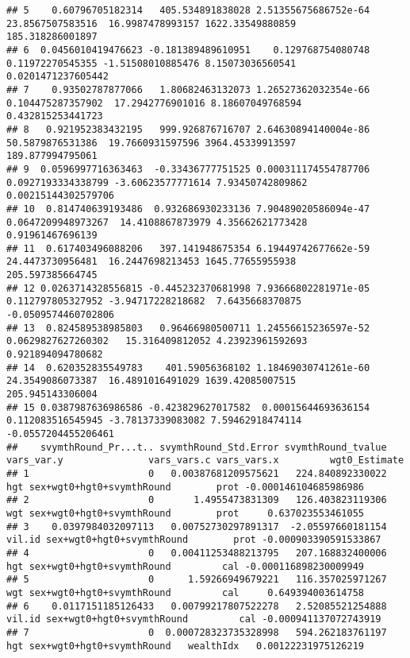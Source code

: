 \documentclass[
]{book}
\begin{document}
\begin{verbatim}
## 5    0.60796705182314   405.534891838028 2.51355675686752e-64   23.8567507583516  16.9987478993157 1622.33549880859     185.318286001897
## 6  0.0456010419476623 -0.181389489610951    0.129768754080748   0.11972270545355 -1.51508010885476 8.15073036560541   0.0201471237605442
## 7    0.93502787877066   1.80682463132073 1.26527362032354e-66  0.104475287357902  17.2942776901016 8.18607049768594    0.432815253441723
## 8   0.921952383432195   999.926876716707 2.64630894140004e-86   50.5879876531386  19.7660931597596 3964.45339913597     189.877994795061
## 9  0.0596997716363463  -0.33436777751525 0.000311174554787706 0.0927193334338799 -3.60623577771614 7.93450742809862  0.00215144302579706
## 10  0.814740639193486  0.932686930233136 7.90489020586094e-47 0.0647209948973267  14.4108867873979 4.35662621773428     0.91961467696139
## 11  0.617403496088206   397.141948675354 6.19449742677662e-59   24.4473730956481  16.2447698213453 1645.77655955938     205.597385664745
## 12 0.0263714328556815 -0.445232370681998 7.93666802281971e-05  0.112797805327952 -3.94717228218682  7.6435668370875  -0.0509574460702806
## 13  0.824589538985803   0.96466980500711 1.24556615236597e-52 0.0629827627260302   15.316409812052 4.23923961592693    0.921894094780682
## 14  0.620352835549783    401.59056368102 1.18469030741261e-60   24.3549086073387  16.4891016491029 1639.42085007515     205.945143306004
## 15 0.0387987636986586 -0.423829627017582  0.00015644693636154  0.112083516545945 -3.78137339083082 7.59462918474114  -0.0557204455206461
##    svymthRound_Pr...t.. svymthRound_Std.Error svymthRound_tvalue vars_var.y               vars_vars.c vars_vars.x         wgt0_Estimate
## 1                     0   0.00387681209575621   224.840892330022        hgt sex+wgt0+hgt0+svymthRound        prot -0.000146104685986986
## 2                     0       1.4955473831309   126.403823119306        wgt sex+wgt0+hgt0+svymthRound        prot     0.637023553461055
## 3    0.0397984032097113   0.00752730297891317  -2.05597660181154     vil.id sex+wgt0+hgt0+svymthRound        prot -0.000903390591533867
## 4                     0   0.00411253488213795   207.168832400006        hgt sex+wgt0+hgt0+svymthRound         cal -0.000116898230009949
## 5                     0      1.59266949679221   116.357025971267        wgt sex+wgt0+hgt0+svymthRound         cal     0.649394003614758
## 6    0.0117151185126433   0.00799217807522278   2.52085521254888     vil.id sex+wgt0+hgt0+svymthRound         cal -0.000941137072743919
## 7                     0  0.000728323735328998   594.262183761197        hgt sex+wgt0+hgt0+svymthRound   wealthIdx   0.00122231975126219

\end{verbatim}
\end{document}
